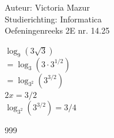 \documentclass[a4paper]{article}
\begin{document}
  
\noindent \large Auteur: Victoria Mazur \\
\noindent \large Studierichting: Informatica\\
\noindent \large Oefeningenreeks 2E nr. 14.25\\

\medskip

\normalsize

$\log_9 (3\sqrt{3})$  \\

$= \log_3 (3 \cdot 3^{1/2})$  \\

$= \log_{3^2} (3^{3/2})$  \\

$2x = 3/2$  \\

$ \log_{3^2} (3^{3/2}) = 3/4$  

\begin{thebibliography}{999}
\end{thebibliography}
\end{document}
